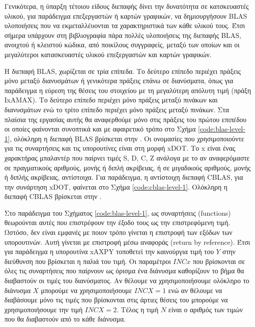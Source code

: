 Γενικότερα, η ύπαρξη τέτοιου είδους διεπαφής δίνει την δυνατότητα σε κατσκευαστές υλικού, για παράδειγμα επεξεργαστών ή καρτών γραφικών, να δημιουργήσουν BLAS υλοποιήσεις που να εκμεταλλέυονται τα χαρακτηριστικά των κάθε υλικού τους. Έτσι σήμερα υπάρχουν στη βιβλιογραφία πάρα πολλές υλοποιήσεις της διεπαφής BLAS, ανοιχτού ή κλειστού κώδικα, από ποικίλους συγγραφείς, μεταξύ των οποίων και οι μεγαλύτεροι κατασκευαστές υλικού επεξεργαστών και καρτών γραφικών.

Η διεπαφή BLAS, χωρίζεται σε τρία επίπεδα. Το δεύτερο επίπεδο περιέχει πράξεις μόνο μεταξύ διανυσμάτων ή γενικότερα πράξεις επάνω σε διανύσματα, όπως για παράδειγμα η εύρεση της θέσεις του στοιχείου με τη μεγαλύτερη απόλυτη τιμή (πράξη IxAMAX). Το δεύτερο επίπεδο περιέχει μόνο πράξεις μεταξύ πινάκων και διανυσμάτων ενώ το τρίτο επίπεδο περιέχει μόνο πράξεις μεταξύ πινάκων. Στα πλαίσια της εργασίας αυτής θα αναφερθούμε μόνο στις πράξεις του πρώτου επιπέδου οι οποίες φαίνονται συνοπτικά και με αφαιρετικό τρόπο στο Σχήμα \ref{code:blas-level-1}, ολόκληρη η διεπαφή BLAS βρίσκεται στην . Οι ονομασίες που χρησιμοποιούντε για τις συναρτήσεις και τις υπορουτίνες είναι στη μορφή xDOT. Το x είναι ένας χαρακτήρας μπαλαντέρ που παίρνει τιμές S, D, C, Z ανάλογα με το αν αναφερόμαστε σε πραγματικούς αριθμούς, μονής ή διπλή ακρίβειας, ή σε μιγαδικούς αριθμούς, μονής ή διπλής ακρίβειας, αντίστοιχα. Για παράδειγμα, η αντίστοιχη διεπαφή CBLAS, για την συνάρτηση xDOT, φαίνεται στο Σχήμα \ref{code:cblas-level-1}. Ολόκληρη η διεπαφή CBLAS βρίσκεται στην .

Στο παράδειγμα του Σχήματος \ref{code:blas-level-1}, ως συναρτήσεις (functions) θεωρούνται αυτές που επιστρέφουν την έξοδο τους ως την επιστρεφόμενη τιμή. Ωστόσο, δεν είναι εμφανές με ποιον τρόπο γίνεται η επιστροφή των εξόδων των υπορουτινών. Αυτή γίνεται με επιστροφή μέσω αναφοράς (return by reference). Έτσι για παράδειγμα η υπορουτίνα xAXPY τοποθετεί την καινούργια τιμή του $Y$ στην διεύθυνση που βρίσκεται η παλιά του τιμή. Οι παραμέτροι $INCx$ που βρίσκονται σε όλες τις συναρτήσεις που παίρνουν ως όρισμα ένα διάνυσμα καθορίζουν το βήμα θα διαβαστούν οι τιμές του διανύσματος. Αν θέλουμε να χρησιμοποιήσουμε ολόκληρο το διάνυσμα $X$ μπορούμε να χρησιμοποιήσουμε $INCX=1$ ενώ αν θέλουμε να διαβάσουμε μόνο τις τιμές που βρίσκονται στις άρτιες θέσεις του μπορούμε να χρησιμοποιήσουμε την τιμή $INCX=2$. Τέλος η τιμή $N$ είναι ο αριθμός των τιμών που θα διαβαστούν από το κάθε διάνυσμα.

